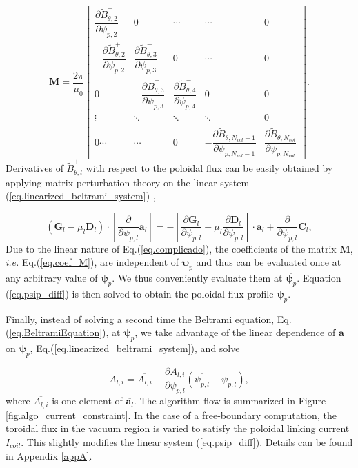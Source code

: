\documentclass[my_thesis.tex]{subfiles}
\begin{document}
\begin{equation}
	\mathbf{M} = \frac{2\pi}{\mu_0} \begin{bmatrix}\dfrac{\partial \tilde{B}^-_{\theta,2}}{\partial{\psi_{p,2}}} & 0 & \cdots & \cdots  & 0 \\
		-\dfrac{\partial \tilde{B}^+_{\theta,2}}{\partial{\psi_{p,2}}} & \dfrac{\partial \tilde{B}^-_{\theta,3}}{\partial{\psi_{p,3}}} & 0  & \cdots & 0\\
		0 & -\dfrac{\partial \tilde{B}^+_{\theta,3}}{\partial{\psi_{p,3}}} & \dfrac{\partial \tilde{B}^-_{\theta,4}}{\partial{\psi_{p,4}}} & 0  & 0 \\
		\vdots & \ddots & \ddots  & \ddots & 0\\
		0 \cdots  & \cdots & 0 & -\dfrac{\partial \tilde{B}^+_{\theta,N_{vol}-1}}{\partial{\psi_{p,N_{vol}-1}}} & \dfrac{\partial \tilde{B}^-_{\theta,N_{vol}}}{\partial{\psi_{p,N_{vol}}}}\end{bmatrix}.\label{eq.matrix_M}
\end{equation}
Derivatives of $\tilde{B}^\pm_{\theta,l}$ with respect to the poloidal flux can be easily obtained by applying matrix perturbation theory on the linear system (\ref{eq.linearized_beltrami_system}) \citep{hudsonComputationMultiregionRelaxed2012},

\begin{equation}
	(\mathbf{G}_l-\mu_l\mathbf{D}_l) \cdot \left[\frac{\partial}{\partial\psi_{p,l}}\mathbf{a}_l\right] = - \left[\frac{\partial\mathbf{G}_l}{\partial\psi_{p,l}}-\mu_l\frac{\partial\mathbf{D}_l}{\partial\psi_{p,l}}\right] \cdot \mathbf{a}_l + \frac{\partial}{\partial\psi_{p,l}}\mathbf{C}_l,\label{eq.perturbed_matrix}
\end{equation}
Due to the linear nature of Eq.(\ref{eq.complicado}), the coefficients of the matrix $\mathbf{M}$, \textit{i.e.} Eq.(\ref{eq.coef_M}), are independent of $\bm{\psi}_p$ and thus can be evaluated once at any arbitrary value of $\bm{\psi}_p$. We thus conveniently evaluate them at $\overbar{\bm{\psi}_p}$. Equation (\ref{eq.psip_diff}) is then solved to obtain the poloidal flux profile $\bm{\psi}_p$. 

Finally, instead of solving a second time the Beltrami equation, Eq.(\ref{eq.BeltramiEquation}), at $\bm{\psi}_p$, we take advantage of the linear dependence of $\mathbf{a}$ on $\bm{\psi}_p$, Eq.(\ref{eq.linearized_beltrami_system}), and solve  

\begin{equation}
	A_{l,i} = \overbar{A_{l,i}} - \frac{\partial {A_{l,i}}}{\partial {\psi_{p,l}}} (\overbar{\psi_{p,l}} - \psi_{p,l}),\label{eq.NewtonStep_Solution}
\end{equation}
where $\overbar{A_{l,i}}$ is one element of $\overbar{\bm{a}_l}$. The algorithm flow is summarized in Figure \ref{fig.algo_current_constraint}. In the case of a free-boundary computation, the toroidal flux in the vacuum region is varied to satisfy the poloidal linking current $I_{coil}$. This slightly modifies the linear system (\ref{eq.psip_diff}). Details can be found in Appendix \ref{appA}.
\end{document}
